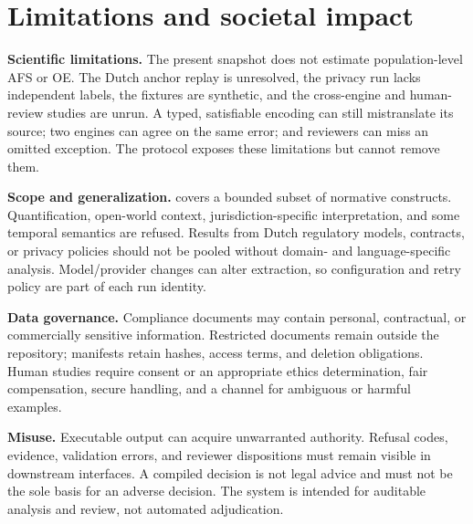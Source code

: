 \section{Limitations and societal impact}

\textbf{Scientific limitations.}
The present snapshot does not estimate population-level AFS or OE. The Dutch
anchor replay is unresolved, the privacy run lacks independent labels, the
fixtures are synthetic, and the cross-engine and human-review studies are
unrun. A typed, satisfiable encoding can still mistranslate its source; two
engines can agree on the same error; and reviewers can miss an omitted
exception. The protocol exposes these limitations but cannot remove them.

\textbf{Scope and generalization.}
\lexir{} covers a bounded subset of normative constructs. Quantification,
open-world context, jurisdiction-specific interpretation, and some temporal
semantics are refused. Results from Dutch regulatory models, contracts, or
privacy policies should not be pooled without domain- and language-specific
analysis. Model/provider changes can alter extraction, so configuration and
retry policy are part of each run identity.

\textbf{Data governance.}
Compliance documents may contain personal, contractual, or commercially
sensitive information. Restricted documents remain outside the repository;
manifests retain hashes, access terms, and deletion obligations. Human studies
require consent or an appropriate ethics determination, fair compensation,
secure handling, and a channel for ambiguous or harmful examples.

\textbf{Misuse.}
Executable output can acquire unwarranted authority. Refusal codes, evidence,
validation errors, and reviewer dispositions must remain visible in downstream
interfaces. A compiled decision is not legal advice and must not be the sole
basis for an adverse decision. The system is intended for auditable analysis
and review, not automated adjudication.
